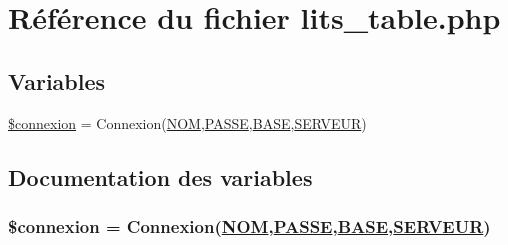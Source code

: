 \hypertarget{lits__table_8php}{
\section{R\'{e}f\'{e}rence du fichier lits\_\-table.php}
\label{lits__table_8php}
}
\subsection*{Variables}
\begin{CompactItemize}
\item 
\hyperlink{lits__table_8php_a0}{\$connexion} = Connexion(\hyperlink{pma__connect_8php_a0}{NOM},\hyperlink{pma__connect_8php_a1}{PASSE},\hyperlink{pma__connect_8php_a3}{BASE},\hyperlink{pma__connect_8php_a2}{SERVEUR})
\end{CompactItemize}


\subsection{Documentation des variables}
\hypertarget{lits__table_8php_a0}{
\subsubsection[\$connexion]{\setlength{\rightskip}{0pt plus 5cm}\$connexion = Connexion(\hyperlink{pma__connect_8php_a0}{NOM},\hyperlink{pma__connect_8php_a1}{PASSE},\hyperlink{pma__connect_8php_a3}{BASE},\hyperlink{pma__connect_8php_a2}{SERVEUR})}}
\label{lits__table_8php_a0}


